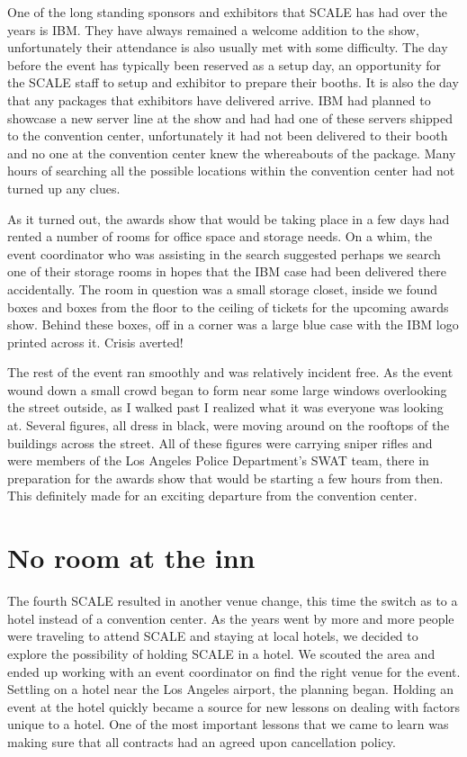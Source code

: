 One of the long standing sponsors and exhibitors that SCALE has had over the
years is IBM.  They have always remained a welcome addition to the show,
unfortunately their attendance is also usually met with some difficulty.  The
day before the event has typically been reserved as a setup day, an opportunity
for the SCALE staff to setup and exhibitor to prepare their booths.  It is also
the day that any packages that exhibitors have delivered arrive.  IBM had
planned to showcase a new server line at the show and had had one of these
servers shipped to the convention center, unfortunately it had not been
delivered to their booth and no one at the convention center knew the
whereabouts of the package.  Many hours of searching all the possible locations
within the convention center had not turned up any clues.

As it turned out, the awards show that would be taking place in a few days had
rented a number of rooms for office space and storage needs.  On a whim, the
event coordinator who was assisting in the search suggested perhaps we search
one of their storage rooms in hopes that the IBM case had been delivered there
accidentally.  The room in question was a small storage closet, inside we found
boxes and boxes from the floor to the ceiling of tickets for the upcoming awards
show.  Behind these boxes, off in a corner was a large blue case with the IBM
logo printed across it.  Crisis averted!

The rest of the event ran smoothly and was relatively incident free.  As the
event wound down a small crowd began to form near some large windows overlooking
the street outside, as I walked past I realized what it was everyone was looking
at.  Several figures, all dress in black, were moving around on the rooftops of
the buildings across the street.  All of these figures were carrying sniper
rifles and were members of the Los Angeles Police Department’s SWAT team, there
in preparation for the awards show that would be starting a few hours from then.
 This definitely made for an exciting departure from the convention center.

\section*{No room at the inn}

The fourth SCALE resulted in another venue change, this time the switch as to a
hotel instead of a convention center.  As the years went by more and more people
were traveling to attend SCALE and staying at local hotels, we decided to
explore the possibility of holding SCALE in a hotel.  We scouted the area and
ended up working with an event coordinator on find the right venue for the
event.  Settling on a hotel near the Los Angeles airport, the planning began. 
Holding an event at the hotel quickly became a source for new lessons on dealing
with factors unique to a hotel.  One of the most important lessons that we came
to learn was making sure that all contracts had an agreed upon cancellation
policy.

